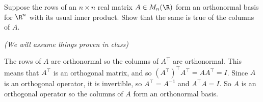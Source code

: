 \begin{problem}
Suppose the rows of an $n\times n$ real matrix $A\in M_n(\R)$ form an orthonormal basis for $\R^n$ with its usual inner product. Show that the same is true of the columns of $A$.
\end{problem}

\textit{(We will assume things proven in class)}

The rows of $A$ are orthonormal so the columns of $A^\intercal$ are orthonormal. This means that $A^\intercal$ is an orthogonal matrix, and so $(A^\intercal)^\intercal A^\intercal = AA^\intercal = I$. Since $A$ is an orthogonal operator, it is invertible, so $A^{\intercal}=A^{-1}$ and $A^{\intercal}A=I$. So $A$ is an orthogonal operator so the columns of $A$ form an orthonormal basis.      